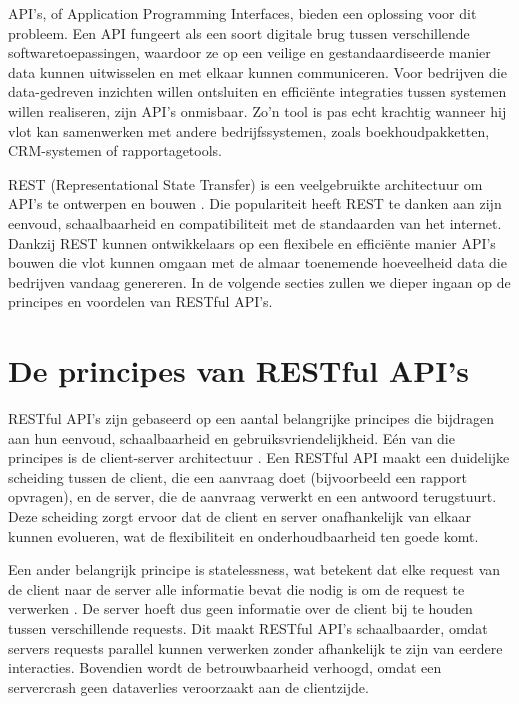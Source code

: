 \bigskip

API's, of Application Programming Interfaces, bieden een oplossing voor dit probleem. Een API fungeert als een soort digitale brug tussen verschillende softwaretoepassingen, waardoor ze op een veilige en gestandaardiseerde manier data kunnen uitwisselen en met elkaar kunnen communiceren. Voor bedrijven die data-gedreven inzichten willen ontsluiten en efficiënte integraties tussen systemen willen realiseren, zijn API's onmisbaar. Zo'n tool is pas echt krachtig wanneer hij vlot kan samenwerken met andere bedrijfssystemen, zoals boekhoudpakketten, CRM-systemen of rapportagetools.

\bigskip

REST (Representational State Transfer) is een veelgebruikte architectuur om API's te ontwerpen en bouwen \autocite{Eddouibi2017}. Die populariteit heeft REST te danken aan zijn eenvoud, schaalbaarheid en compatibiliteit met de standaarden van het internet. Dankzij REST kunnen ontwikkelaars op een flexibele en efficiënte manier API's bouwen die vlot kunnen omgaan met de almaar toenemende hoeveelheid data die bedrijven vandaag genereren. In de volgende secties zullen we dieper ingaan op de principes en voordelen van RESTful API's.

\section{De principes van RESTful API's}

RESTful API's zijn gebaseerd op een aantal belangrijke principes die bijdragen aan hun eenvoud, schaalbaarheid en gebruiksvriendelijkheid. Eén van die principes is de client-server architectuur \autocite{Fielding2000}. Een RESTful API maakt een duidelijke scheiding tussen de client, die een aanvraag doet (bijvoorbeeld een rapport opvragen), en de server, die de aanvraag verwerkt en een antwoord terugstuurt. Deze scheiding zorgt ervoor dat de client en server onafhankelijk van elkaar kunnen evolueren, wat de flexibiliteit en onderhoudbaarheid ten goede komt.

\bigskip

Een ander belangrijk principe is statelessness, wat betekent dat elke request van de client naar de server alle informatie bevat die nodig is om de request te verwerken \autocite{Fielding2000}. De server hoeft dus geen informatie over de client bij te houden tussen verschillende requests. Dit maakt RESTful API's schaalbaarder, omdat servers requests parallel kunnen verwerken zonder afhankelijk te zijn van eerdere interacties. Bovendien wordt de betrouwbaarheid verhoogd, omdat een servercrash geen dataverlies veroorzaakt aan de clientzijde.

